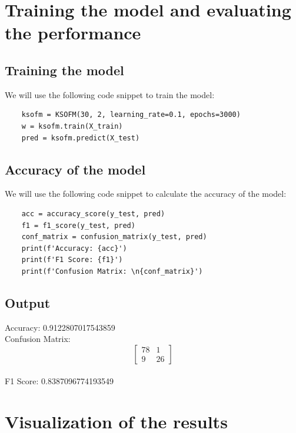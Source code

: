 \section{Training the model and evaluating the performance}
\subsection{Training the model}
We will use the following code snippet to train the model:
\begin{verbatim}
    ksofm = KSOFM(30, 2, learning_rate=0.1, epochs=3000)
    w = ksofm.train(X_train)
    pred = ksofm.predict(X_test)
\end{verbatim}
\subsection{Accuracy of the model}
We will use the following code snippet to calculate the accuracy of the model:
\begin{verbatim}
    acc = accuracy_score(y_test, pred)
    f1 = f1_score(y_test, pred)
    conf_matrix = confusion_matrix(y_test, pred)
    print(f'Accuracy: {acc}')
    print(f'F1 Score: {f1}')
    print(f'Confusion Matrix: \n{conf_matrix}')
\end{verbatim}
\subsection{Output}
Accuracy: 0.9122807017543859\\
Confusion Matrix:
$$
\begin{bmatrix}
    78 & 1 \\
    9 & 26
\end{bmatrix}
$$\\
F1 Score: 0.8387096774193549\\
\section{Visualization of the results}
